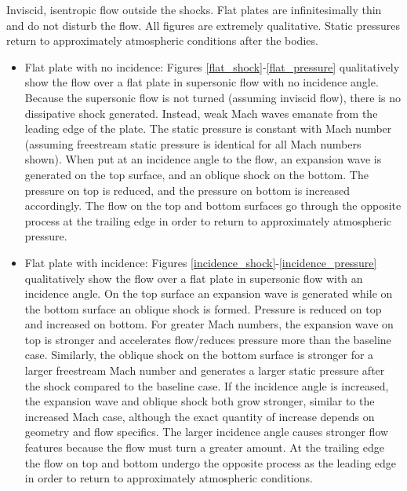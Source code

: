 \documentclass[../main.tex]{subfiles}
\begin{document}


\assumptions{}
Inviscid, isentropic flow outside the shocks.
Flat plates are infinitesimally thin and do not disturb the flow.
All figures are extremely qualitative.
Static pressures return to approximately atmospheric conditions after the bodies. 

\begin{itemize}

    \item Flat plate with no incidence: Figures \ref{flat_shock}-\ref{flat_pressure} qualitatively show the flow over a flat plate in supersonic flow with no incidence angle.
    Because the supersonic flow is not turned (assuming inviscid flow), there is no dissipative shock generated.
    Instead, weak Mach waves emanate from the leading edge of the plate.
    The static pressure is constant with Mach number (assuming freestream static pressure is identical for all Mach numbers shown).
    When put at an incidence angle to the flow, an expansion wave is generated on the top surface, and an oblique shock on the bottom.
    The pressure on top is reduced, and the pressure on bottom is increased accordingly.
    The flow on the top and bottom surfaces go through the opposite process at the trailing edge in order to return to approximately atmospheric pressure. 

    \item Flat plate with incidence: Figures \ref{incidence_shock}-\ref{incidence_pressure} qualitatively show the flow over a flat plate in supersonic flow with an incidence angle.
    On the top surface an expansion wave is generated while on the bottom surface an oblique shock is formed.
    Pressure is reduced on top and increased on bottom. 
    For greater Mach numbers, the expansion wave on top is stronger and accelerates flow/reduces pressure more than the baseline case.
    Similarly, the oblique shock on the bottom surface is stronger for a larger freestream Mach number and generates a larger static pressure after the shock compared to the baseline case.
    If the incidence angle is increased, the expansion wave and oblique shock both grow stronger, similar to the increased Mach case, although the exact quantity of increase depends on geometry and flow specifics.
    The larger incidence angle causes stronger flow features because the flow must turn a greater amount.
    At the trailing edge the flow on top and bottom undergo the opposite process as the leading edge in order to return to approximately atmospheric conditions. 


\end{itemize}
\end{document}
